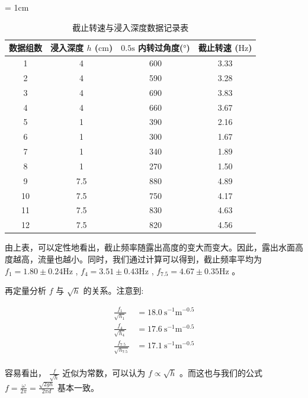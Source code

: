 \documentclass[fontset=windows]{article}
\begin{document}
\begin{table}[htbp]
    \centering
    \caption{截止转速与浸入深度数据记录表}
    \label{table2}
    \renewcommand\arraystretch{1.5}
    \tabcolsep = 1cm
    \begin{tabular}{|c|c|c|c|}
        \hline
        数据组数 & 浸入深度 $h$ ($\text{cm}$) & $0.5\text{s}$ 内转过角度($\text{°}$)  & 截止转速 ($\text{Hz}$) \\
        \hline
        1 & 4 & 600 & 3.33 \\
        \hline
        2 & 4 & 590 & 3.28 \\
        \hline
        3 & 4 & 690 & 3.83 \\
        \hline
        4 & 4 & 660 & 3.67 \\
        \hline
        5 & 1 & 390 & 2.16 \\
        \hline
        6 & 1 & 300 & 1.67 \\
        \hline
        7 & 1 & 340 & 1.89 \\
        \hline
        8 & 1 & 270 & 1.50 \\
        \hline
        9 & 7.5 & 880 & 4.89 \\
        \hline
        10 & 7.5 & 750 & 4.17 \\
        \hline
        11 & 7.5 & 830 & 4.63 \\
        \hline
        12 & 7.5 & 820 & 4.56 \\
        \hline
    \end{tabular}
\end{table}

由上表，可以定性地看出，截止频率随露出高度的变大而变大。因此，露出水面高度越高，流量也越小。同时，我们通过计算可以得到，截止频率平均为 $f_1 = 1.80 \pm 0.24 \text{Hz} $ , $f_4 = 3.51 \pm 0.43 \text{Hz}$ , $f_{7.5} = 4.67 \pm 0.35 \text{Hz}$ 。

再定量分析 $f$ 与 $\sqrt{h}$ 的关系。注意到: 

$$
\begin{aligned}
    \frac{f_1}{\sqrt{h_1}} &= 18.0 \ \text{s}^{-1} \text{m}^{-0.5} \\
    \frac{f_4}{\sqrt{h_4}} &= 17.6 \ \text{s}^{-1} \text{m}^{-0.5} \\
    \frac{f_{7.5}}{\sqrt{h_{7.5}}} &= 17.1 \ \text{s}^{-1} \text{m}^{-0.5} \\
\end{aligned}
$$

容易看出， $\frac{f} {\sqrt{h}}$ 近似为常数，可以认为 $f \propto \sqrt{h}$ 。而这也与我们的公式 $f = \frac{\omega}{2\pi} = \frac{\sqrt{2gh}}{2\pi d}$ 基本一致。
\end{document}
